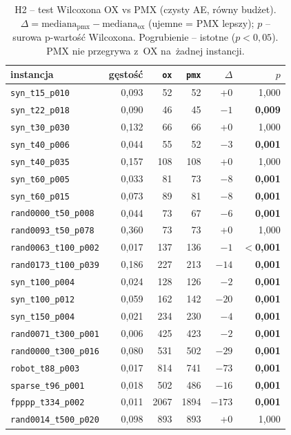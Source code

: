 \documentclass[pdflatex,sn-mathphys,Numbered]{sn-jnl}
\begin{document}
\begin{table}[ht]
\centering\scriptsize\setlength{\tabcolsep}{5pt}
\begin{tabular}{lrrrrr}
\toprule
instancja & gęstość & \texttt{ox} & \texttt{pmx} & $\Delta$ & $p$ \\
\midrule
\texttt{syn\_t15\_p010} & 0{,}093 & 52 & 52 & +0 & 1{,}000 \\
\texttt{syn\_t22\_p018} & 0{,}090 & 46 & 45 & \textbf{$-1$} & \textbf{0{,}009} \\
\texttt{syn\_t30\_p030} & 0{,}132 & 66 & 66 & +0 & 1{,}000 \\
\texttt{syn\_t40\_p006} & 0{,}044 & 55 & 52 & \textbf{$-3$} & \textbf{0{,}001} \\
\texttt{syn\_t40\_p035} & 0{,}157 & 108 & 108 & +0 & 1{,}000 \\
\texttt{syn\_t60\_p005} & 0{,}033 & 81 & 73 & \textbf{$-8$} & \textbf{0{,}001} \\
\texttt{syn\_t60\_p015} & 0{,}073 & 89 & 81 & \textbf{$-8$} & \textbf{0{,}001} \\
\texttt{rand0000\_t50\_p008} & 0{,}044 & 73 & 67 & \textbf{$-6$} & \textbf{0{,}001} \\
\texttt{rand0093\_t50\_p078} & 0{,}360 & 73 & 73 & +0 & 1{,}000 \\
\texttt{rand0063\_t100\_p002} & 0{,}017 & 137 & 136 & \textbf{$-1$} & \textbf{$<$0{,}001} \\
\texttt{rand0173\_t100\_p039} & 0{,}186 & 227 & 213 & \textbf{$-14$} & \textbf{0{,}001} \\
\texttt{syn\_t100\_p004} & 0{,}024 & 128 & 126 & \textbf{$-2$} & \textbf{0{,}001} \\
\texttt{syn\_t100\_p012} & 0{,}059 & 162 & 142 & \textbf{$-20$} & \textbf{0{,}001} \\
\texttt{syn\_t150\_p004} & 0{,}021 & 234 & 230 & \textbf{$-4$} & \textbf{0{,}001} \\
\texttt{rand0071\_t300\_p001} & 0{,}006 & 425 & 423 & \textbf{$-2$} & \textbf{0{,}001} \\
\texttt{rand0000\_t300\_p016} & 0{,}080 & 531 & 502 & \textbf{$-29$} & \textbf{0{,}001} \\
\texttt{robot\_t88\_p003} & 0{,}017 & 814 & 741 & \textbf{$-73$} & \textbf{0{,}001} \\
\texttt{sparse\_t96\_p001} & 0{,}018 & 502 & 486 & \textbf{$-16$} & \textbf{0{,}001} \\
\texttt{fpppp\_t334\_p002} & 0{,}011 & 2067 & 1894 & \textbf{$-173$} & \textbf{0{,}001} \\
\texttt{rand0014\_t500\_p020} & 0{,}098 & 893 & 893 & +0 & 1{,}000 \\
\bottomrule
\end{tabular}
\caption{H2 -- test Wilcoxona OX vs PMX (czysty AE, równy budżet).
$\Delta = \text{mediana}_{\text{pmx}} - \text{mediana}_{\text{ox}}$ (ujemne =
PMX lepszy); $p$ -- surowa p-wartość Wilcoxona. Pogrubienie -- istotne
($p<0{,}05$). PMX nie przegrywa z~OX na~żadnej instancji.}
\label{tab:h2}
\end{table}
\end{document}
